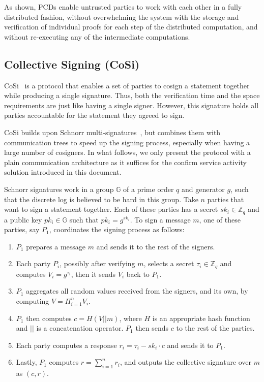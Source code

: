 As shown, PCDs enable untrusted parties to work with each other in a fully distributed fashion, without overwhelming the system with the storage and verification of individual proofs for each step of the distributed computation, and without re-executing any of the intermediate computations. 


\subsection{Collective Signing (CoSi)}
\label{cosi}
CoSi~\cite{syta2016keeping} is a protocol that enables a set of parties to cosign a statement together while producing a single signature. Thus, both the verification time and the space requirements are just like having a single signer. However, this signature holds all parties accountable for the statement they agreed to sign.


CoSi builds upon Schnorr multi-signatures~\cite{schnorr1991efficient, bellare2006multi, micali2001accountable}, but combines them with communication trees to speed up the signing process, especially when having a large number of cosigners. In what follows, we only present the protocol with a plain communication architecture as it suffices for the confirm service activity solution introduced in this document.


Schnorr signatures work in a group $\mathbb{G}$ of a prime order $q$ and generator $g$, such that the discrete log is believed to be hard in this group. Take $n$ parties that want to sign a statement together. Each of these parties has a secret $sk_i \in \mathbb{Z}_q$ and a public key $pk_i \in \mathbb{G}$ such that $pk_i = g^{sk_i}$. To sign a message $m$, one of these parties, say $P_1$, coordinates the signing process as follows: 
\begin{enumerate}
\setlength{\itemsep}{0pt}
\item $P_1$ prepares a message $m$ and sends it to the rest of the signers.

\item Each party $P_i$, possibly after verifying $m$, selects a secret $\tau_i \in \mathbb{Z}_q$ and computes $V_i = g^{\tau_i}$, then it sends $V_i$ back to $P_1$.

\item $P_1$ aggregates all random values received from the signers, and its own, by computing $V = \Pi_{i =1}^n V_i$.

\item $P_1$ then computes $c = H(V||m)$, where $H$ is an appropriate hash function and $||$ is a concatenation operator. $P_1$ then sends $c$ to the rest of the parties.

\item Each party computes a response $r_i = \tau_i - sk_i\cdot c$ and sends it to $P_1$.

\item Lastly, $P_1$ computes $r = \sum_{i=1}^n r_i$, and outputs the collective signature over $m$ as $(c, r)$.
\end{enumerate}


